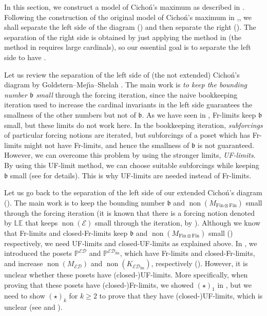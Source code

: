 \documentclass[a4paper,12pt]{amsart}
\theoremstyle{definition}
\numberwithin{thm}{section}
\numberwithin{equation}{section}
\newcommand{\bb}{\mathfrak{b}}
\DeclareMathOperator{\non}{non}
\newcommand{\ed}{\mathcal{ED}}
\newcommand{\none}{\non(\mathcal{E})}
\newcommand{\edfin}{\mathcal{ED}_\mathrm{fin}}
\newcommand{\finfin}{\mathrm{Fin}\otimes\mathrm{Fin}}
\newcommand{\posetEDfin}{\mathbb{P}^{\edfin}}
\newcommand{\posetED}{\mathbb{P}^{\ed}}
\begin{document}
    In this section, we construct a model of Cicho\'n's maximum as described in . 
    Following the construction of the original model of Cicho\'n's maximum in \cite{GKS19},\cite{GKMS22}, we shall separate the left side of the diagram () and then separate the right (). The separation of the right side is obtained by just applying the method in  \cite{GKMS22} (the method in \cite{GKS19} requires large cardinals),
    so our essential goal is to separate the left side to have .
    
    Let us review the separation of the left side of (the not extended) Cicho\'n's diagram by Goldstern--Mej{\'\i}a--Shelah \cite{GMS16}. The main work is \textit{to keep the bounding number $\bb$ small} through the forcing iteration, since the naive bookkeeping iteration used to increase the cardinal invariants in the left side guarantees the smallness of the other numbers but not of $\bb$.
    As we have seen in , Fr-limits keep $\bb$ small, but these limits do not work here. In the bookkeeping iteration, \textit{subforcings} of particular forcing notions are iterated, but subforcings of a poset which has Fr-limits might not have Fr-limits, and hence the smallness of $\bb$ is not guaranteed.
    However, we can overcome this problem by using the stronger limits, \textit{UF-limits}.
    By using this UF-limit method, we can choose suitable subforcings while keeping $\bb$ small (see \cite{GMS16} for details). This is why UF-limits are needed instead of Fr-limits.
    
    Let us go back to the separation of the left side of our extended Cicho\'n's diagram (). The main work is to keep the bounding number $\bb$ and $\non(M_{\finfin})$ small through the forcing iteration (it is known that there is a forcing notion denoted by $\mathbb{LE}$ that keeps $\none$ small through the iteration, by \cite{Yam24}). Although we know that Fr-limits and closed-Fr-limits keep $\bb$ and $\non(M_{\finfin})$ small () respectively, we need UF-limits and closed-UF-limits as explained above.
    In , we introduced the posets $\posetED$ and $\posetEDfin$, which have Fr-limits and closed-Fr-limits, and increase $\non(M_{\ed})$ and $\non(K_{\edfin})$, respectively (). However, it is unclear whether these posets have (closed-)UF-limits. More specifically, when proving that these posets have (closed-)Fr-limits, we showed $(\star)_1$ in , but we need to show $(\star)_k$ for $k\geq2$ to prove that they have (closed-)UF-limits, which is unclear (see  and ). 
    
\end{document}
